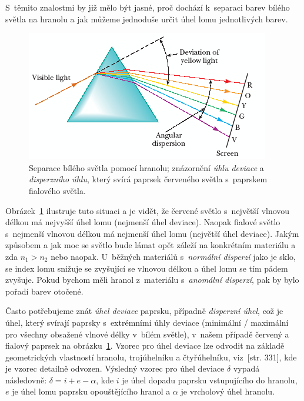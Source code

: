 S~těmito znalostmi by již mělo být jasné, proč
dochází k~separaci barev bílého světla na hranolu
a jak můžeme jednoduše určit úhel lomu jednotlivých
barev.
\begin{figure}[htbp]
    \centering
    \includegraphics[scale=0.2]{img/prism.png}
    \caption{Separace bílého světla pomocí hranolu;
    znázornění \textit{úhlu deviace} a
    \textit{disperzního úhlu}, který svírá
    paprsek červeného světla s~paprskem
    fialového světla.}
    \label{fig:prism}
\end{figure}
Obrázek~\ref{fig:prism} ilustruje tuto situaci
a je vidět, že červené světlo s~největší vlnovou
délkou má nejvyšší úhel lomu (nejmenší úhel
deviace). Naopak fialové světlo s~nejmenší
vlnovou délkou má nejmenší úhel lomu (největší
úhel deviace). Jakým způsobem a jak moc se
světlo bude lámat opět záleží na konkrétním
materiálu a zda $n_1 > n_2$ nebo naopak.
U~běžných materiálů s~\textit{normální disperzí}
jako je sklo, se index lomu snižuje se zvyšující
se vlnovou délkou a úhel lomu se tím pádem
zvyšuje. Pokud bychom měli hranol z~materiálu
s~\textit{anomální disperzí}, pak by bylo pořadí
barev otočené.

Často potřebujeme znát \textit{úhel deviace}
paprsku,
případně \textit{disperzní úhel}, což je úhel,
který svírají paprsky s~extrémními úhly deviace
(minimální / maximální pro všechny obsažené
vlnové délky v~bílém světle),
v~našem případě červený a fialový paprsek na
obrázku~\ref{fig:prism}.
Vzorec pro úhel deviace lze odvodit na
základě geometrických vlastností hranolu,
trojúhelníku a čtyřúhelníku,
viz~\cite{ray_optics}[str. 331], kde je vzorec detailně
odvozen. Výsledný vzorec pro úhel deviace
$\delta$ vypadá následovně:
$\delta = i + e - \alpha$, kde $i$ je úhel
dopadu paprsku vstupujícího do hranolu,
$e$ je úhel lomu paprsku opouštějícího hranol
a $\alpha$ je vrcholový úhel hranolu.

